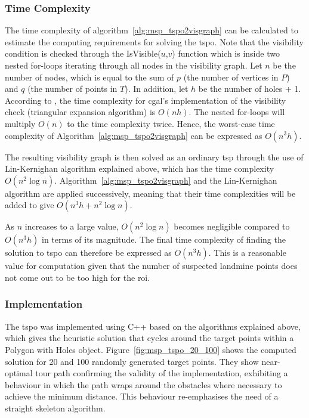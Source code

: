 \subsubsection{Time Complexity}

The time complexity of algorithm~\ref{alg:msp_tspo2visgraph} can be calculated to estimate the computing requirements for solving the \gls{tspo}. Note that the visibility condition is checked through the IsVisible($u$,$v$) function which is inside two nested for-loops iterating through all nodes in the visibility graph. Let $n$ be the number of nodes, which is equal to the sum of $p$ (the number of vertices in $P$) and $q$ (the number of points in $T$). In addition, let $h$ be the number of holes + 1. According to \cite{cgal2024visibility}, the time complexity for \gls{cgal}'s implementation of the visibility check (triangular expansion algorithm) is $O(n h)$. The nested for-loops will multiply $O(n)$ to the time complexity twice. Hence, the worst-case time complexity of Algorithm~\ref{alg:msp_tspo2visgraph} can be expressed as $O(n^3 h)$. 

The resulting visibility graph is then solved as an ordinary \gls{tsp} through the use of Lin-Kernighan algorithm explained above, which has the time complexity $O(n^2\log{n})$. Algorithm~\ref{alg:msp_tspo2visgraph} and the Lin-Kernighan algorithm are applied successively, meaning that their time complexities will be added to give $O(n^3 h + n^2\log{n})$. 

As $n$ increases to a large value, $O(n^2\log{n})$ becomes negligible compared to $O(n^3 h)$ in terms of its magnitude. The final time complexity of finding the solution to \gls{tspo} can therefore be expressed as $O(n^3 h)$. This is a reasonable value for computation given that the number of suspected landmine points does not come out to be too high for the \gls{roi}. 


\subsubsection{Implementation}

The \gls{tspo} was implemented using C++ based on the algorithms explained above, which gives the heuristic solution that cycles around the target points within a Polygon with Holes object. Figure~\ref{fig:msp_tspo_20_100} shows the computed solution for 20 and 100 randomly generated target points. They show near-optimal tour path confirming the validity of the implementation, exhibiting a behaviour in which the path wraps around the obstacles where necessary to achieve the minimum distance. This behaviour re-emphasises the need of a straight skeleton algorithm. 

